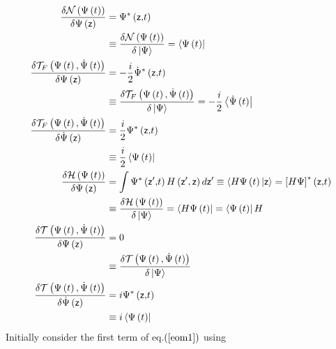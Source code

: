 \documentclass[aps,preprint]{revtex4}
\begin{document}
\begin{align}
\frac{\delta\mathcal{N}\left( \Psi\left( t\right) \right) }{\delta
\Psi\left( \mathsf{z}\right) } & =\Psi^{\ast}\left( \mathsf{z,}t\right) 
\notag \\
& \equiv\frac{\delta\mathcal{N}\left( \Psi\left( t\right) \right) }{%
\delta\left| \Psi\right\rangle }=\left\langle \Psi\left( t\right) \right| \\
\frac{\delta\mathcal{T}_{F}\left( \Psi\left( t\right) ,\dot{\Psi}\left(
t\right) \right) }{\delta\Psi\left( \mathsf{z}\right) } & =-\frac{i}{2}\dot{%
\Psi}^{\ast}\left( \mathsf{z,}t\right)  \notag \\
& \equiv\frac{\delta\mathcal{T}_{F}\left( \Psi\left( t\right) ,\dot{\Psi }%
\left( t\right) \right) }{\delta\left| \Psi\right\rangle }=-\frac{i}{2}%
\left\langle \dot{\Psi}\left( t\right) \right| \\
\frac{\delta\mathcal{T}_{F}\left( \Psi\left( t\right) ,\dot{\Psi}\left(
t\right) \right) }{\delta\dot{\Psi}\left( \mathsf{z}\right) } & =\frac {i}{2}%
\Psi^{\ast}\left( \mathsf{z,}t\right)  \notag \\
& \equiv\frac{i}{2}\left\langle \Psi\left( t\right) \right| \\
\frac{\delta\mathcal{H}\left( \Psi\left( t\right) \right) }{\delta
\Psi\left( \mathsf{z}\right) } & =\int\Psi^{\ast}\left( \mathsf{z}^{\prime}%
\mathsf{,}t\right) H\left( \mathsf{z}^{\prime},\mathsf{z}\right) d\mathsf{z}%
^{\prime}\equiv\left\langle H\Psi\left( t\right) |\mathsf{z}\right\rangle =%
\left[ H\Psi\right] ^{\ast}\left( \mathsf{z,}t\right)  \notag \\
& \equiv\frac{\delta\mathcal{H}\left( \Psi\left( t\right) \right) }{%
\delta\left| \Psi\right\rangle }=\left\langle H\Psi\left( t\right) \right|
=\left\langle \Psi\left( t\right) \right| H \\
\frac{\delta\mathcal{T}\left( \Psi\left( t\right) ,\dot{\Psi}\left( t\right)
\right) }{\delta\Psi\left( \mathsf{z}\right) } & =0  \notag \\
& \equiv\frac{\delta\mathcal{T}\left( \Psi\left( t\right) ,\dot{\Psi }\left(
t\right) \right) }{\delta\left| \Psi\right\rangle } \\
\frac{\delta\mathcal{T}\left( \Psi\left( t\right) ,\dot{\Psi}\left( t\right)
\right) }{\delta\dot{\Psi}\left( \mathsf{z}\right) } & =i\Psi^{\ast}\left( 
\mathsf{z,}t\right)  \notag \\
& \equiv i\left\langle \Psi\left( t\right) \right|
\end{align}
Initially consider the first term of eq.$\left( \ref{eom1}\right) $ using
\end{document}
